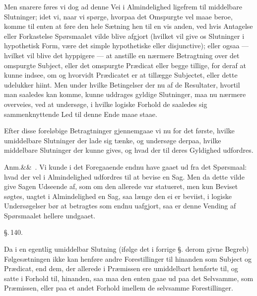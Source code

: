 \documentclass[12pt]{book}
\makeatletter
\def\sperr#1{#1}%
\def\textit#1{#1}%
\def\emph#1{#1}%
\newcommand{\sperr}[1]{\textls[180]{#1}}
\newcommand{\umph}[2][misc]{%
  \@ifundefined{umph@#1@on}{#2}{\emph{#2}}}
\newcommand{\parag}[1]{%
  \par\vspace{0.9\baselineskip}%
  {\centering\textit{\S.\,#1.}\par}%
  \vspace{0.35\baselineskip}%
  \noindent\hspace{\parindent}\ignorespaces
}
\newcommand{\anm}[1]{%
  \par\vspace{0.5\baselineskip}%
  \noindent\hspace{\parindent}\sperr{Anm.}\ifx&#1&\else~\textit{#1}.\fi
  \enspace\ignorespaces
}
\newcommand{\opage}[1]{\marginnote{\footnotesize\textit{[#1]}}}
\makeatother
\begin{document}
Men snarere føres vi dog ad denne Vei i Almindelighed ligefrem
til middelbare Slutninger; idet vi, naar vi spørge, hvorpaa det
Omspurgte vel maae beroe, komme til enten at føre den hele
Sætning hen til en vis anden, ved hvis Antagelse eller Forkastelse
Spørsmaalet vilde blive afgjort (hvilket vil give os Slutninger i
hypothetisk Form, være det simple hypothetiske eller disjunctive);
eller ogsaa --- hvilket vil blive det hyppigere --- at anstille en
nærmere Betragtning over det omspurgte Subject, eller det
omspurgte Prædicat eller begge tillige, for deraf at kunne indsee,
om og hvorvidt Prædicatet er at tillægge Subjectet, eller dette
udelukker hiint. Men under hvilke Betingelser der nu af de
Resultater, hvortil man saaledes kan komme, kunne uddrages
gyldige Slutninger, maa nu nærmere overveies, ved at undersøge,
i hvilke logiske Forhold de saaledes sig sammenknyttende Led til
denne Ende maae staae.

\opage{329} Efter disse foreløbige Betragtninger gjennemgaae vi nu for det første, hvilke
umiddelbare Slutninger der lade sig tænke, og undersøge derpaa, hvilke
middelbare Slutninger der kunne gives, og hvad der til deres Gyldighed
udfordres.

\anm{} Vi kunde i det Foregaaende endnu have gaaet ud fra det Spørsmaal: hvad
der vel i Almindelighed udfordres til at bevise en Sag. Men da dette vilde give
Sagen Udseende af, som om den allerede var statueret, men kun Beviset søgtes,
uagtet i Almindelighed en Sag, saa længe den ei er beviist, i logiske
Undersøgelser bør at betragtes som endnu uafgjort, saa er denne Vending af
Spørsmaalet hellere undgaaet.

\parag{140}

Da i en egentlig umiddelbar Slutning (ifølge det i forrige §. derom givne
Begreb) Følgesætningen ikke kan henføre andre Forestillinger til hinanden som
Subject og Prædicat, end dem, der allerede i Præmissen ere umiddelbart henførte
til, og satte i Forhold til, hinanden, saa maa den enten gaae ud paa det
Selvsamme, som Præmissen, eller paa et andet Forhold imellem de selvsamme
Forestillinger.
\end{document}
